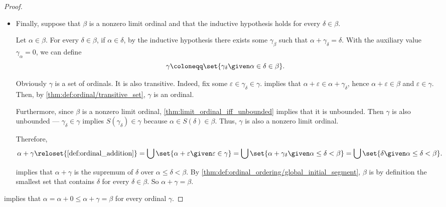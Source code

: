 \begin{proof}
\begin{itemize}
\begin{itemize}
      \item If \( \alpha = \delta \), then \( \alpha \in S(\delta) = \beta \) and the conclusion holds with \( \gamma = 1 \).
    \end{itemize}

    \item Finally, suppose that \( \beta \) is a nonzero limit ordinal and that the inductive hypothesis holds for every \( \delta \in \beta \).

    Let \( \alpha \in \beta \). For every \( \delta \in \beta \), if \( \alpha \in \delta \), by the inductive hypothesis there exists some \( \gamma_\beta \) such that \( \alpha + \gamma_\delta = \delta \). With the auxiliary value \( \gamma_\alpha = 0 \), we can define
    \begin{equation*}
      \gamma \coloneqq \set{ \gamma_\delta \given \alpha \in \delta \in \beta }.
    \end{equation*}

    Obviously \( \gamma \) is a set of ordinals. It is also transitive. Indeed, fix some \( \varepsilon \in \gamma_\delta \in \gamma \).  implies that \( \alpha + \varepsilon \in \alpha + \gamma_\delta \), hence \( \alpha + \varepsilon \in \beta \) and \( \varepsilon \in \gamma \). Then, by \cref{thm:def:ordinal/transitive_set}, \( \gamma \) is an ordinal.

    Furthermore, since \( \beta \) is a nonzero limit ordinal, \cref{thm:limit_ordinal_iff_unbounded} implies that it is unbounded. Then \( \gamma \) is also unbounded --- \( \gamma_\delta \in \gamma \) implies \( S(\gamma_\delta) \in \gamma \) because \( \alpha \in S(\delta) \in \beta \). Thus, \( \gamma \) is also a nonzero limit ordinal.

    Therefore,
    \begin{equation*}
      \alpha + \gamma
      \reloset {\ref{def:ordinal_addition}} =
      \bigcup\set{ \alpha + \varepsilon \given \varepsilon \in \gamma }
      =
      \bigcup\set{ \alpha + \gamma_\delta \given \alpha \leq \delta < \beta }
      =
      \bigcup\set{ \delta \given \alpha \leq \delta < \beta }.
    \end{equation*}

     implies that \( \alpha + \gamma \) is the supremum of \( \delta \) over \( \alpha \leq \delta < \beta \). By \cref{thm:def:ordinal_ordering/global_initial_segment}, \( \beta \) is by definition the smallest set that contains \( \delta \) for every \( \delta \in \beta \). So \( \alpha + \gamma = \beta \).
  \end{itemize}

  \NecessitySubProof {} implies that \( \alpha = \alpha + 0 \leq \alpha + \gamma = \beta \) for every ordinal \( \gamma \).
\end{proof}

